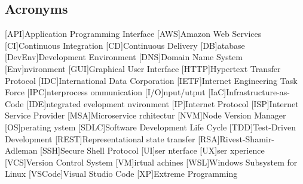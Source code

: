 \newcommand{\abbr}{Abbreviations}
\subsection{Acronyms}

\begin{acronym}[1234567890]		%
\setlength{\itemsep}{-\parsep}	%

[API]{Application Programming Interface}
[AWS]{Amazon Web Services}
[CI]{Continuous Integration}
[CD]{Continuous Delivery}
[DB]{atabase}
[DevEnv]{Development Environment}
[DNS]{Domain Name System}
[Env]{nvironment}
[GUI]{Graphical User Interface}
[HTTP]{Hypertext Transfer Protocol}
[IDC]{International Data Corporation}
[IETF]{Internet Engineering Task Force}
[IPC]{nterprocess ommunication}
[I/O]{nput/utput}
[IaC]{Infrastructure-as-Code}
[IDE]{ntegrated evelopment nvironment}
[IP]{Internet Protocol}
[ISP]{Internet Service Provider}
[MSA]{Microservice rchitectur}
[NVM]{Node Version Manager}
[OS]{perating ystem}
[SDLC]{Software Development Life Cycle}
[TDD]{Test-Driven Development}
[REST]{Representational state transfer}
[RSA]{Rivest-Shamir-Adleman}
[SSH]{Secure Shell Protocol}
[UI]{ser nterface}
[UX]{ser xperience}
[VCS]{Version Control System}
[VM]{irtual achines}
[WSL]{Windows Subsystem for Linux}
[VSCode]{Visual Studio Code}
[XP]{Extreme Programming}
\end{acronym}
